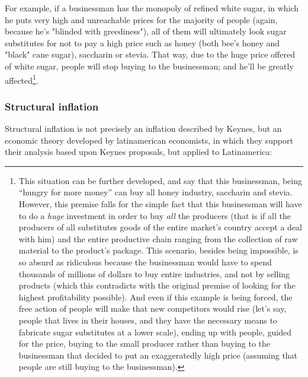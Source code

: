 \documentclass[12pt,a4paper,twoside]{book}
\begin{document}
For example, if a businessman has the monopoly of refined white sugar, in which he puts very high and unreachable prices for the majority of people (again, because he's "blinded with greediness"), all of them will ultimately look sugar substitutes for not to pay a high price such as honey (both bee's honey and "black" cane sugar), saccharin or stevia. That way, due to the huge price offered of white sugar, people will stop buying to the businessman; and he'll be greatly affected\footnote{This situation can be further developed, and say that this businessman, being “hungry for more money” can buy all honey industry, saccharin and stevia. However, this premise falls for the simple fact that this businessman will have to do a \textit{huge} investment in order to buy \textit{all} the producers (that is if all the producers of all substitutes goods of the entire market's country accept a deal with him) and the entire productive chain ranging from the collection of raw material to the product's package. This scenario, besides being impossible, is so absurd as ridiculous because the businessman would have to spend thousands of millions of dollars to buy entire industries, and not by selling products (which this contradicts with the original premise of looking for the highest profitability possible). And even if this example is being forced, the free action of people will make that new competitors would rise (let's say, people that lives in their houses, and they have the necessary means to fabricate sugar substitutes at a lower scale), ending up with people, guided for the price, buying to the small producer rather than buying to the businessman that decided to put an exaggeratedly high price (assuming that people are still buying to the businessman).}.

\subsubsection{Structural inflation}
Structural inflation is not precisely an inflation described by Keynes, but an economic theory developed by latinamerican economists, in which they support their analysis based upon Keynes proposals, but applied to Latinamerica:
\end{document}
